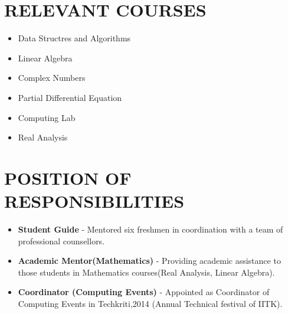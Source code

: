 \documentclass[margin, 10pt]{res} %
\begin{document}
\begin{resume}
\section{RELEVANT COURSES}
\begin{multicols}{2}
\begin{itemize}
\item Data Structres and Algorithms
\item Linear Algebra
\item Complex Numbers
\item Partial Differential Equation
\item Computing Lab
\item Real Analysis
\end{itemize}
\end{multicols}
\section{POSITION OF RESPONSIBILITIES}
\begin{itemize}
\item {\bf Student Guide} - Mentored six freshmen in coordination with a team of professional counsellors.
\item {\bf Academic Mentor(Mathematics)} - Providing academic assistance to those students in Mathematics courses(Real Analysis, Linear Algebra).
\item {\bf Coordinator (Computing Events)} - Appointed as Coordinator of Computing Events in Techkriti,2014 (Annual Technical festival of IITK).
\end{itemize}
\end{resume}
\end{document}
